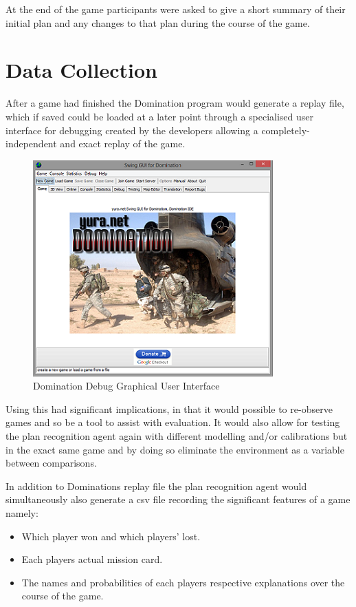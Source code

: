 \documentclass[parskip]{cs4rep}
\begin{document}
At the end of the game participants were asked to give a short summary of their initial plan and any changes to that plan during the course of the game.

\newpage

\section{Data Collection}

After a game had finished the Domination program would generate a replay file, which if saved could be loaded at a later point through a specialised user interface for debugging created by the developers allowing a completely-independent and exact replay of the game.

\begin{figure}[h]
\centerline{
\includegraphics{images/domination-debug-gui.png}
}
\caption{Domination Debug Graphical User Interface}
\label{fig:dom-debug-gui}
\end{figure} 

Using this had significant implications, in that it would possible to re-observe games and so be a tool to assist with evaluation. It would also allow for testing the plan recognition agent again with different modelling and/or calibrations but in the exact same game and by doing so eliminate the environment as a variable between comparisons.

In addition to Dominations replay file the plan recognition agent would simultaneously also generate a csv file recording the significant features of a game namely:

\begin{itemize}
\item
Which player won and which players' lost.
\item
Each players actual mission card.
\item
The names and probabilities of each players respective explanations over the course of the game.
\end{itemize}
\end{document}
